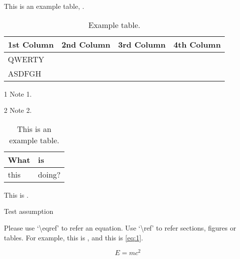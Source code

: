 \begin{tempsection}
    This is an example table, .
    \begin{table}[htbp]
        \begin{center}
        \begin{threeparttable}
        \caption{Example table.\label{tb:this_is_table}}
        \centering
            \begin{tabular}{l c c c}
                \toprule
                    \textbf{1st Column} & \textbf{2nd Column} & \textbf{3rd Column} & \textbf{4th Column} \\ 
                \midrule
                    QWERTY\tnote{1}   &                     &                     &  \\
                    ASDFGH\tnote{2}   &                     &                     &  \\ 
                \bottomrule
            \end{tabular}
            \begin{tablenotes}
                \item [1] Note 1. 
                \item [2] Note 2.
            \end{tablenotes}
        \end{threeparttable}
    \end{center}
    \end{table}

    \begingroup
    \begin{table}
        \centering
        \caption{This is an example table.}\label{tbl:nicetablelesstable}
        \begin{tabular}{ll}
            What & is     \\
            \hline
            this & doing? \\
        \end{tabular}
    \end{table}
    \endgroup

    This is .
    \begin{assumption}\label{ass:ass1}
        Test assumption
    \end{assumption}

    Please use `\textbackslash eqref' to refer an equation. Use `\textbackslash ref' to refer sections, figures or tables. For example, this is , and this is \eqref{eq:1}.

    \begin{equation}
        E = mc^2
        \label{eq:1}
    \end{equation}

\end{tempsection}